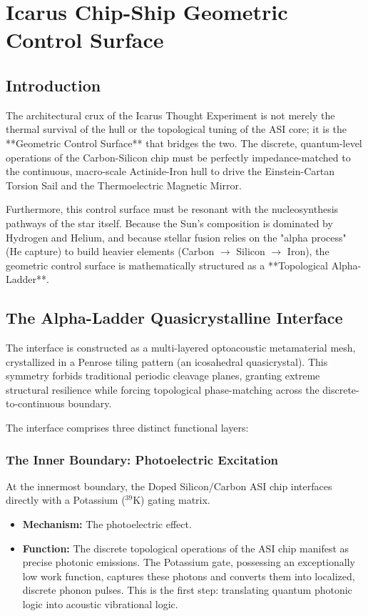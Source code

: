 \chapter[Icarus Chip-Ship Geometric Control]{Icarus Chip-Ship Geometric Control Surface}
\label{ch:icarus_architecture}

\section{Introduction}
The architectural crux of the Icarus Thought Experiment is not merely the thermal survival of the hull or the topological tuning of the ASI core; it is the **Geometric Control Surface** that bridges the two. The discrete, quantum-level operations of the Carbon-Silicon chip must be perfectly impedance-matched to the continuous, macro-scale Actinide-Iron hull to drive the Einstein-Cartan Torsion Sail and the Thermoelectric Magnetic Mirror.

Furthermore, this control surface must be resonant with the nucleosynthesis pathways of the star itself. Because the Sun's composition is dominated by Hydrogen and Helium, and because stellar fusion relies on the "alpha process" (He capture) to build heavier elements (Carbon $\to$ Silicon $\to$ Iron), the geometric control surface is mathematically structured as a **Topological Alpha-Ladder**.

\section[The Alpha-Ladder Quasicrystalline]{The Alpha-Ladder Quasicrystalline Interface}
The interface is constructed as a multi-layered optoacoustic metamaterial mesh, crystallized in a Penrose tiling pattern (an icosahedral quasicrystal). This symmetry forbids traditional periodic cleavage planes, granting extreme structural resilience while forcing topological phase-matching across the discrete-to-continuous boundary. 

The interface comprises three distinct functional layers:

\subsection[The Inner Boundary]{The Inner Boundary: Photoelectric Excitation}
At the innermost boundary, the Doped Silicon/Carbon ASI chip interfaces directly with a Potassium ($^{39}\text{K}$) gating matrix.
\begin{itemize}
    \item \textbf{Mechanism:} The photoelectric effect. 
    \item \textbf{Function:} The discrete topological operations of the ASI chip manifest as precise photonic emissions. The Potassium gate, possessing an exceptionally low work function, captures these photons and converts them into localized, discrete phonon pulses. This is the first step: translating quantum photonic logic into acoustic vibrational logic.
\end{itemize}

